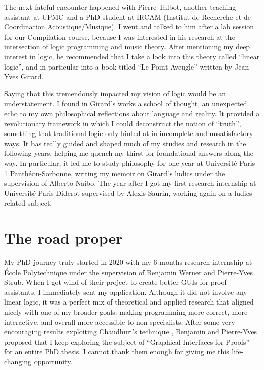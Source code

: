 The next fateful encounter happened with Pierre Talbot, another teaching assistant at UPMC and a PhD student at IRCAM (Institut de Recherche et de Coordination Acoustique/Musique). I went and talked to him after a lab session for our Compilation course, because I was interested in his research at the intersection of logic programming and music theory. After mentioning my deep interest in logic, he recommended that I take a look into this theory called ``linear logic'', and in particular into a book titled ``Le Point Aveugle'' written by Jean-Yves Girard.

Saying that this tremendously impacted my vision of logic would be an understatement. I found in Girard's works a school of thought, an unexpected echo to my own philosophical reflections about language and reality. It provided a revolutionary framework in which I could deconstruct the notion of ``truth'', something that traditional logic only hinted at in incomplete and unsatisfactory ways. It has really guided and shaped much of my studies and research in the following years, helping me quench my thirst for foundational answers along the way. In particular, it led me to study philosophy for one year at Université Paris 1 Panthéon-Sorbonne, writing my memoir on Girard's ludics under the supervision of Alberto Naibo. The year after I got my first research internship at Université Paris Diderot supervised by Alexis Saurin, working again on a ludics-related subject.

\section*{The road proper}

My PhD journey truly started in 2020 with my 6 months research internship at École Polytechnique under the supervision of Benjamin Werner and Pierre-Yves Strub. When I got wind of their project to create better GUIs for proof assistants, I immediately sent my application. Although it did not involve any linear logic, it was a perfect mix of theoretical and applied research that aligned nicely with one of my broader goals: making programming more correct, more interactive, and overall more accessible to non-specialists. After some very encouraging results exploiting Chaudhuri's  technique \cite{Chaudhuri2013}, Benjamin and Pierre-Yves proposed that I keep exploring the subject of ``Graphical Interfaces for Proofs'' for an entire PhD thesis. I cannot thank them enough for giving me this life-changing opportunity.

